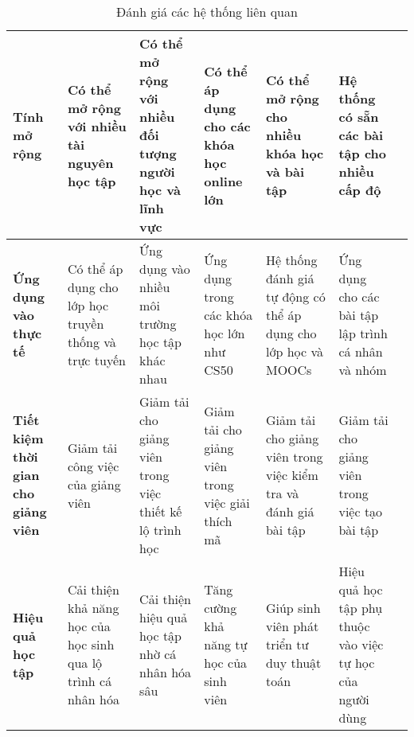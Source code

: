 \begin{table}[ht]
{\begin{tabular}{|p{3.5cm}|p{3.5cm}|p{3.5cm}|p{3.5cm}|p{3.5cm}|p{3.5cm}|p{3.5cm}|}
    \textbf{Tính mở rộng} & Có thể mở rộng với nhiều tài nguyên học tập & Có thể mở rộng với nhiều đối tượng người học và lĩnh vực & Có thể áp dụng cho các khóa học online lớn & Có thể mở rộng cho nhiều khóa học và bài tập & Hệ thống có sẵn các bài tập cho nhiều cấp độ \\ \hline
    \textbf{Ứng dụng vào thực tế} & Có thể áp dụng cho lớp học truyền thống và trực tuyến & Ứng dụng vào nhiều môi trường học tập khác nhau & Ứng dụng trong các khóa học lớn như CS50 & Hệ thống đánh giá tự động có thể áp dụng cho lớp học và MOOCs & Ứng dụng cho các bài tập lập trình cá nhân và nhóm \\ \hline
    \textbf{Tiết kiệm thời gian cho giảng viên} & Giảm tải công việc của giảng viên & Giảm tải cho giảng viên trong việc thiết kế lộ trình học & Giảm tải cho giảng viên trong việc giải thích mã & Giảm tải cho giảng viên trong việc kiểm tra và đánh giá bài tập & Giảm tải cho giảng viên trong việc tạo bài tập \\ \hline
    \textbf{Hiệu quả học tập} & Cải thiện khả năng học của học sinh qua lộ trình cá nhân hóa & Cải thiện hiệu quả học tập nhờ cá nhân hóa sâu & Tăng cường khả năng tự học của sinh viên & Giúp sinh viên phát triển tư duy thuật toán & Hiệu quả học tập phụ thuộc vào việc tự học của người dùng \\ \hline
    \end{tabular}
    }
    \caption{Đánh giá các hệ thống liên quan}
    \end{table}
